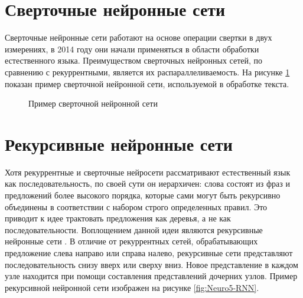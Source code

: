 \section{Сверточные нейронные сети}\label{ch:nn:cnn}
Сверточные нейронные сети работают на основе операции свертки в двух измерениях, в 2014 году \cite{kalchbrenner_2014} они начали применяться в области обработки естественного языка. Преимуществом сверточных нейронных сетей, по сравнению с рекуррентными, является их распараллеливаемость. На рисунке \ref{fig:Neuro4-CNN} показан пример сверточной нейронной сети, используемой в обработке текста.


\begin{figure}[ht]
  \caption{Пример сверточной нейронной сети}\label{fig:Neuro4-CNN}
\end{figure}

\section{Рекурсивные нейронные сети}\label{ch:nn:rcnn}
Хотя рекуррентные и сверточные нейросети рассматривают естественный язык как последовательность, по своей сути он иерархичен: слова состоят из фраз и предложений более высокого порядка, которые сами могут быть рекурсивно объединены в соответствии с набором строго определенных правил. Это приводит к идее трактовать предложения как деревья, а не как последовательности. Воплощением данной идеи являются рекурсивные нейронные сети \cite{socher_2013}. В отличие от рекуррентных сетей, обрабатывающих предложение слева направо или справа налево, рекурсивные сети представляют последовательность снизу вверх или сверху вниз. Новое представление в каждом узле находится при помощи составления представлений дочерних узлов. Пример рекурсивной нейронной сети изображен на рисунке \ref{fig:Neuro5-RNN}.



